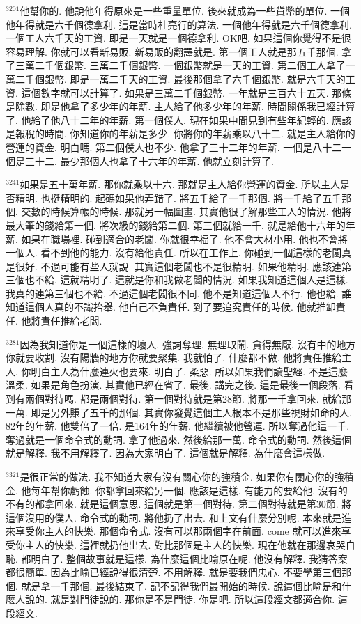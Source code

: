 \documentclass{book}
\begin{document}
$^{3201}$他幫你的.
他說他年得原來是一些重量單位.
後來就成為一些貨幣的單位.
一個他年得就是六千個德拿利.
這是當時杜亮行的算法.
一個他年得就是六千個德拿利.
一個工人六千天的工資.
即是一天就是一個德拿利.
OK吧.
如果這個你覺得不是很容易理解.
你就可以看新易販.
新易販的翻譯就是.
第一個工人就是那五千那個.
拿了三萬二千個銀幣.
三萬二千個銀幣.
一個銀幣就是一天的工資.
第二個工人拿了一萬二千個銀幣.
即是一萬二千天的工資.
最後那個拿了六千個銀幣.
就是六千天的工資.
這個數字就可以計算了.
如果是三萬二千個銀幣.
一年就是三百六十五天.
那條是除數.
即是他拿了多少年的年薪.
主人給了他多少年的年薪.
時間關係我已經計算了.
他給了他八十二年的年薪.
第一個僕人.
現在如果中間見到有些年紀輕的.
應該是報稅的時間.
你知道你的年薪是多少.
你將你的年薪乘以八十二.
就是主人給你的營運的資金.
明白嗎.
第二個僕人也不少.
他拿了三十二年的年薪.
一個是八十二一個是三十二.
最少那個人也拿了十六年的年薪.
他就立刻計算了.

$^{3241}$如果是五十萬年薪.
那你就乘以十六.
那就是主人給你營運的資金.
所以主人是否精明.
也挺精明的.
起碼如果他弄錯了.
將五千給了一千那個.
將一千給了五千那個.
交數的時候算帳的時候.
那就另一幅圖畫.
其實他很了解那些工人的情況.
他將最大筆的錢給第一個.
將次級的錢給第二個.
第三個就給一千.
就是給他十六年的年薪.
如果在職場裡.
碰到適合的老闆.
你就很幸福了.
他不會大材小用.
他也不會將一個人.
看不到他的能力.
沒有給他責任.
所以在工作上.
你碰到一個這樣的老闆真是很好.
不過可能有些人就說.
其實這個老闆也不是很精明.
如果他精明.
應該連第三個也不給.
這就精明了.
這就是你和我做老闆的情況.
如果我知道這個人是這樣.
我真的連第三個也不給.
不過這個老闆很不同.
他不是知道這個人不行.
他也給.
誰知道這個人真的不識抬舉.
他自己不負責任.
到了要追究責任的時候.
他就推卸責任.
他將責任推給老闆.

$^{3281}$因為我知道你是一個這樣的壞人.
強詞奪理.
無理取鬧.
貪得無厭.
沒有中的地方你就要收割.
沒有陽牆的地方你就要聚集.
我就怕了.
什麼都不做.
他將責任推給主人.
你明白主人為什麼連火也要來.
明白了.
柔惡.
所以如果我們讀聖經.
不是這麼溫柔.
如果是角色扮演.
其實他已經在省了.
最後.
講完之後.
這是最後一個段落.
看到有兩個對待嗎.
都是兩個對待.
第一個對待就是第28節.
將那一千拿回來.
就給那一萬.
即是另外賺了五千的那個.
其實你發覺這個主人根本不是那些視財如命的人.
82年的年薪.
他雙倍了一倍.
是164年的年薪.
他繼續被他營運.
所以奪過他這一千.
奪過就是一個命令式的動詞.
拿了他過來.
然後給那一萬.
命令式的動詞.
然後這個就是解釋.
我不用解釋了.
因為大家明白了.
這個就是解釋.
為什麼會這樣做.

$^{3321}$是很正常的做法.
我不知道大家有沒有關心你的強積金.
如果你有關心你的強積金.
他每年幫你虧蝕.
你都拿回來給另一個.
應該是這樣.
有能力的要給他.
沒有的不有的都拿回來.
就是這個意思.
這個就是第一個對待.
第二個對待就是第30節.
將這個沒用的僕人.
命令式的動詞.
將他扔了出去.
和上文有什麼分別呢.
本來就是進來享受你主人的快樂.
那個命令式.
沒有可以那兩個字在前面.
come 就可以進來享受你主人的快樂.
這裡就扔他出去.
對比那個是主人的快樂.
現在他就在那邊哀哭自恥.
都明白了.
整個故事就是這樣.
為什麼這個比喻原在呢.
他沒有解釋.
我猜答案都很簡單.
因為比喻已經說得很清楚.
不用解釋.
就是要我們忠心.
不要學第三個那個.
就是拿一千那個.
最後結束了.
記不記得我們最開始的時候.
說這個比喻是和什麼人說的.
就是對門徒說的.
那你是不是門徒.
你是吧.
所以這段經文都適合你.
這段經文.
\end{document}
